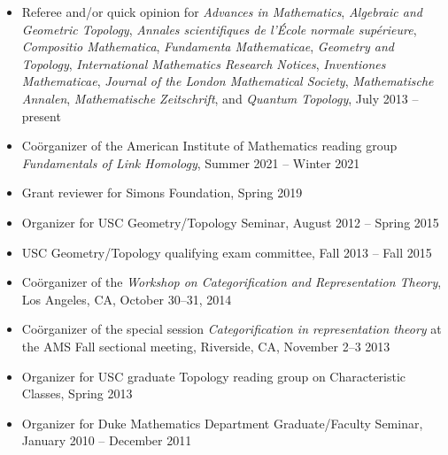 \documentclass[10pt]{article}
\begin{document}
\begin{itemize}



\item Referee and/or quick opinion for 
{\it Advances in Mathematics}, 
{\it Algebraic and Geometric Topology}, 
{\it Annales scientifiques de l'\'{E}cole normale sup\'{e}rieure},
{\it Compositio Mathematica},
{\it Fundamenta Mathematicae}, 
{\it Geometry and Topology}, 
{\it International Mathematics Research Notices},
{\it Inventiones Mathematicae},
{\it Journal of the London Mathematical Society},
{\it Mathematische Annalen},
{\it Mathematische Zeitschrift},
and {\it Quantum Topology},
July 2013 -- present

\item Co\"{o}rganizer of the American Institute of Mathematics reading group \emph{Fundamentals of Link Homology},
Summer 2021 -- Winter 2021

\item Grant reviewer for Simons Foundation, Spring 2019

\item Organizer for USC Geometry/Topology Seminar, August 2012 -- Spring 2015

\item USC Geometry/Topology qualifying exam committee, Fall 2013 -- Fall 2015

\item Co\"{o}rganizer of the \emph{Workshop on Categorification and Representation Theory},
Los Angeles, CA, October 30--31, 2014

\item Co\"{o}rganizer of the special session \emph{Categorification in representation theory} at the AMS Fall sectional meeting,
Riverside, CA, November 2--3 2013

\item Organizer for USC graduate Topology reading group on Characteristic Classes, Spring 2013

\item Organizer for Duke Mathematics Department Graduate/Faculty Seminar, January 2010 -- December 2011

\end{itemize}






\end{document}
